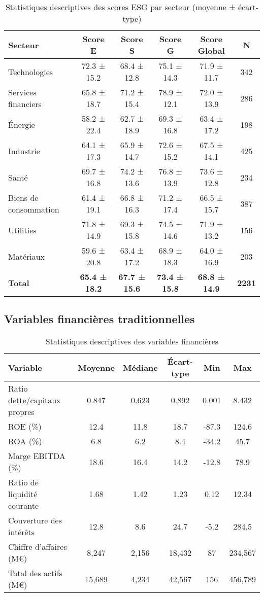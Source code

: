 \begin{table}[h]
\centering
\begin{tabular}{|l|c|c|c|c|c|}
\hline
\textbf{Secteur} & \textbf{Score E} & \textbf{Score S} & \textbf{Score G} & \textbf{Score Global} & \textbf{N} \\
\hline
Technologies & 72.3 ± 15.2 & 68.4 ± 12.8 & 75.1 ± 14.3 & 71.9 ± 11.7 & 342 \\
Services financiers & 65.8 ± 18.7 & 71.2 ± 15.4 & 78.9 ± 12.1 & 72.0 ± 13.9 & 286 \\
Énergie & 58.2 ± 22.4 & 62.7 ± 18.9 & 69.3 ± 16.8 & 63.4 ± 17.2 & 198 \\
Industrie & 64.1 ± 17.3 & 65.9 ± 14.7 & 72.6 ± 15.2 & 67.5 ± 14.1 & 425 \\
Santé & 69.7 ± 16.8 & 74.2 ± 13.6 & 76.8 ± 13.9 & 73.6 ± 12.8 & 234 \\
Biens de consommation & 61.4 ± 19.1 & 66.8 ± 16.3 & 71.2 ± 17.4 & 66.5 ± 15.7 & 387 \\
Utilities & 71.8 ± 14.9 & 69.3 ± 15.8 & 74.5 ± 14.6 & 71.9 ± 13.2 & 156 \\
Matériaux & 59.6 ± 20.8 & 63.4 ± 17.2 & 68.9 ± 18.3 & 64.0 ± 16.9 & 203 \\
\hline
\textbf{Total} & \textbf{65.4 ± 18.2} & \textbf{67.7 ± 15.6} & \textbf{73.4 ± 15.8} & \textbf{68.8 ± 14.9} & \textbf{2231} \\
\hline
\end{tabular}
\caption{Statistiques descriptives des scores ESG par secteur (moyenne ± écart-type)}
\end{table}

\subsection{Variables financières traditionnelles}

\begin{table}[h]
\centering
\begin{tabular}{|l|c|c|c|c|c|}
\hline
\textbf{Variable} & \textbf{Moyenne} & \textbf{Médiane} & \textbf{Écart-type} & \textbf{Min} & \textbf{Max} \\
\hline
Ratio dette/capitaux propres & 0.847 & 0.623 & 0.892 & 0.001 & 8.432 \\
ROE (\%) & 12.4 & 11.8 & 18.7 & -87.3 & 124.6 \\
ROA (\%) & 6.8 & 6.2 & 8.4 & -34.2 & 45.7 \\
Marge EBITDA (\%) & 18.6 & 16.4 & 14.2 & -12.8 & 78.9 \\
Ratio de liquidité courante & 1.68 & 1.42 & 1.23 & 0.12 & 12.34 \\
Couverture des intérêts & 12.8 & 8.6 & 24.7 & -5.2 & 284.5 \\
Chiffre d'affaires (M€) & 8,247 & 2,156 & 18,432 & 87 & 234,567 \\
Total des actifs (M€) & 15,689 & 4,234 & 42,567 & 156 & 456,789 \\
\hline
\end{tabular}
\caption{Statistiques descriptives des variables financières}
\end{table}


